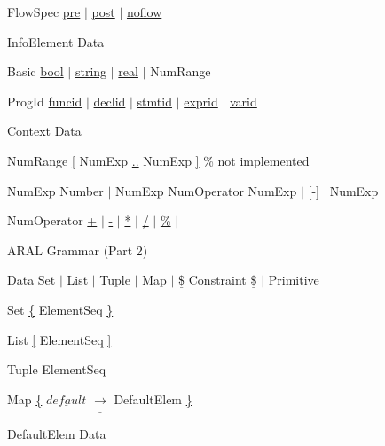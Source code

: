 \documentclass[a4paper,12pt]{report}
\begin{document}
{\begin{figure}[!ht]
\begin{GRAMMAR}
{FlowSpec}       \>\>\>\>\>\garrow\> \underline{pre} $\mid$ \underline{post} $\mid$ \underline{noflow}

{InfoElement}    \>\>\>\>\>\garrow\>  Data 

{Basic}          \>\>\>\>\>\garrow\> \underline{bool} $\mid$ \underline{string} $\mid$ \underline{real} $\mid$ NumRange

{ProgId}         \>\>\>\>\>\garrow\> \underline{funcid} $\mid$ \underline{declid} $\mid$ \underline{stmtid} $\mid$ \underline{exprid} $\mid$ \underline{varid}


{Context}        \>\>\>\>\>\garrow\> Data

{NumRange}       \>\>\>\>\>\garrow\> \underline{[} NumExp \underline{..} NumExp \underline {]} \% not implemented

{NumExp}         \>\>\>\>\>\garrow\> [-] Number
                 \>\>\>\>\> \>$\mid$ NumExp NumOperator NumExp
                 \>\>\>\>\> \>$\mid$ [-] \lb~NumExp \rb

{NumOperator}    \>\>\>\>\>\garrow\> \underline{+} $\mid$ \underline{-} $\mid$ \underline{*} $\mid$ \underline{/} $\mid$ \underline{\%} $\mid$ \underline{}

\end{GRAMMAR}
\caption{ARAL Grammar (Part 2)}
\label{fig:aralone}
\end{figure}

\begin{figure}[!ht]
\begin{GRAMMAR}
{Data}    \>\>\>\>\>\garrow\> Set
                 \>\>\>\>\> \>$\mid$ List
                 \>\>\>\>\> \>$\mid$ Tuple
                 \>\>\>\>\> \>$\mid$ Map
                 \>\>\>\>\> \>$\mid$ $\underline{\$}$ Constraint $\underline{\$}$
                 \>\>\>\>\> \>$\mid$ Primitive

{Set}            \>\>\>\>\>\garrow\> \underline{\{} ElementSeq \underline{\}}

{List}           \>\>\>\>\>\garrow\> \underline{[} ElementSeq \underline{]}

{Tuple}          \>\>\>\>\>\garrow\> \lb ElementSeq \rb

{Map}            \>\>\>\>\>\garrow\> \underline{\{} $\underline{default} $ $\underline{\rightarrow}$ DefaultElem  \underline{\}}

{DefaultElem} \>\>\>\>\>\garrow\> Data


\end{GRAMMAR}
\end{figure}}
\end{document}
